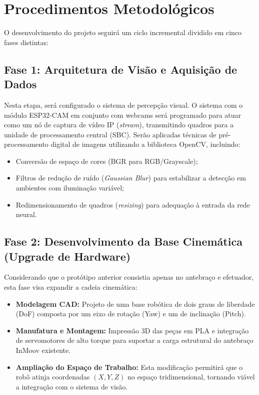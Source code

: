 \section*{Procedimentos Metodológicos}

O desenvolvimento do projeto seguirá um ciclo incremental dividido em cinco fases distintas:

\subsection*{Fase 1: Arquitetura de Visão e Aquisição de Dados}
Nesta etapa, será configurado o sistema de percepção visual. O sistema com o módulo ESP32-CAM em conjunto com webcams será programado para atuar como um nó de captura de vídeo IP (\textit{stream}), transmitindo quadros para a unidade de processamento central (SBC). Serão aplicadas técnicas de pré-processamento digital de imagens utilizando a biblioteca OpenCV, incluindo:
\begin{itemize}
    \item Conversão de espaço de cores (BGR para RGB/Grayscale);
    \item Filtros de redução de ruído (\textit{Gaussian Blur}) para estabilizar a detecção em ambientes com iluminação variável;
    \item Redimensionamento de quadros (\textit{resizing}) para adequação à entrada da rede neural.
\end{itemize}

\subsection*{Fase 2: Desenvolvimento da Base Cinemática (Upgrade de Hardware)}
Considerando que o protótipo anterior  consistia apenas no antebraço e efetuador, esta fase visa expandir a cadeia cinemática:
\begin{itemize}
    \item \textbf{Modelagem CAD:} Projeto de uma base robótica de dois graus de liberdade (DoF) composta por um eixo de rotação (Yaw) e um de inclinação (Pitch).
    \item \textbf{Manufatura e Montagem:} Impressão 3D das peças em PLA e integração de servomotores de alto torque para suportar a carga estrutural do antebraço InMoov existente.
    \item \textbf{Ampliação do Espaço de Trabalho:} Esta modificação permitirá que o robô atinja coordenadas $(X, Y, Z)$ no espaço tridimensional, tornando viável a integração com o sistema de visão.
\end{itemize}

